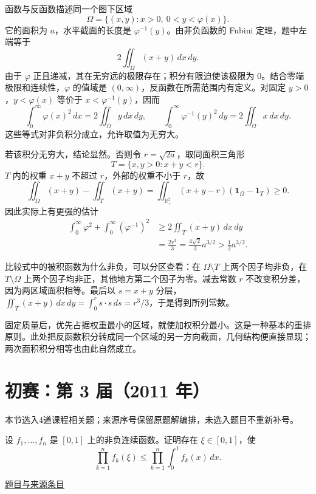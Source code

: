 \documentclass[12pt,fontset=fandol]{ctexart}
\begin{document}
\begin{solve}\label{ans:pre02-math:8}

函数与反函数描述同一个图下区域
\[
\Omega=\{(x,y):x>0,\ 0<y<\varphi(x)\}.
\]
它的面积为 $a$，水平截面的长度是 $\varphi^{-1}(y)$。由非负函数的 Fubini 定理，题中左端等于
\[
2\iint_\Omega(x+y)\,dx\,dy.
\]
由于 $\varphi$ 正且递减，其在无穷远的极限存在；积分有限迫使该极限为 $0$。结合零端极限和连续性，$\varphi$ 的值域是 $(0,\infty)$，反函数在所需范围内有定义。对固定 $y>0$，$y<\varphi(x)$ 等价于 $x<\varphi^{-1}(y)$，因而
\[
\int_0^\infty\varphi(x)^2\,dx=2\iint_\Omega y\,dx\,dy,
\qquad
\int_0^\infty\varphi^{-1}(y)^2\,dy=2\iint_\Omega x\,dx\,dy.
\]
这些等式对非负积分成立，允许取值为无穷大。

若该积分无穷大，结论显然。否则令 $r=\sqrt{2a}$，取同面积三角形
\[
T=\{x,y>0:x+y<r\}.
\]
$T$ 内的权重 $x+y$ 不超过 $r$，外部的权重不小于 $r$，故
\[
\iint_\Omega(x+y)-\iint_T(x+y)
=\iint_{\mathbb R_+^2}(x+y-r)(\mathbf1_\Omega-\mathbf1_T)\ge0.
\]
因此实际上有更强的估计
\[
\begin{aligned}
\int_0^\infty\varphi^2+\int_0^\infty(\varphi^{-1})^2
&\ge2\iint_T(x+y)\,dx\,dy\\
&=\frac{2r^3}{3}
=\frac{4\sqrt2}{3}a^{3/2}
>\frac12a^{3/2}.
\end{aligned}
\]

比较式中的被积函数为什么非负，可以分区查看：在 $\Omega\setminus T$ 上两个因子均非负，在 $T\setminus\Omega$ 上两个因子均非正，其他地方第二个因子为零。减去常数 $r$ 不改变积分差，因为两区域面积相等。最后以 $s=x+y$ 分层，$\iint_T(x+y)\,dx\,dy=\int_0^r s\cdot s\,ds=r^3/3$，于是得到所列常数。

\end{solve}

\begin{remark}[方法与条件]固定质量后，优先占据权重最小的区域，就使加权积分最小。这是一种基本的重排原则。此处把反函数积分转成同一个区域的另一方向截面，几何结构便直接显现；两次面积积分相等也由此自然成立。\end{remark}

\section{初赛：第 3 届（2011 年）}

本节选入4道课程相关题；来源序号保留原题解编排，未选入题目不重新补号。

\begin{example}[来源序号2]\label{ex:pre03-math:2}\label{pr:pre03-math:2}

设 $f_1,\ldots,f_n$ 是 $[0,1]$ 上的非负连续函数。证明存在 $\xi\in[0,1]$，使
\[
\prod_{k=1}^nf_k(\xi)
\le\prod_{k=1}^n\int_0^1f_k(x)\,dx.
\]

\par\href{https://github.com/lzxcr/cmc-mathematics/blob/64916fa1fdbc3e444a652eca204d5669058ee321/src/problems/preliminary/03/02.md}{题目与来源条目}

\end{example}
\end{document}
